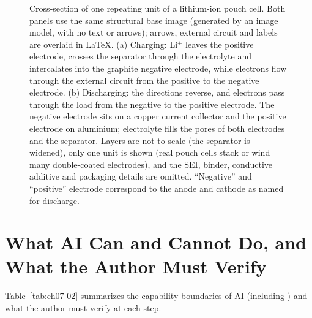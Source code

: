 \begin{figure}[htbp]\centering

\caption{Cross-section of one repeating unit of a lithium-ion pouch cell. Both panels use the same structural base image (generated by an image model, with no text or arrows); arrows, external circuit and labels are overlaid in LaTeX. (a) Charging: Li$^+$ leaves the positive electrode, crosses the separator through the electrolyte and intercalates into the graphite negative electrode, while electrons flow through the external circuit from the positive to the negative electrode. (b) Discharging: the directions reverse, and electrons pass through the load from the negative to the positive electrode. The negative electrode sits on a copper current collector and the positive electrode on aluminium; electrolyte fills the pores of both electrodes and the separator. Layers are not to scale (the separator is widened), only one unit is shown (real pouch cells stack or wind many double-coated electrodes), and the SEI, binder, conductive additive and packaging details are omitted. ``Negative'' and ``positive'' electrode correspond to the anode and cathode as named for discharge.}\label{fig:ch07-08}
\end{figure}

\section{What AI Can and Cannot Do, and What the Author Must Verify}

Table~\ref{tab:ch07-02} summarizes the capability boundaries of AI (including \scidraw{}) and what the author must verify at each step.

